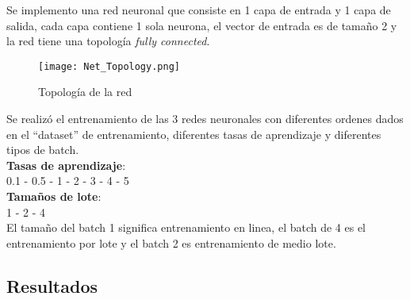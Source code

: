 Se implemento una red neuronal que consiste en 1 capa de entrada y 1 capa de salida, cada capa contiene
1 sola neurona, el vector de entrada es de tamaño 2 y la red tiene una topología \textit{fully connected}.
\begin{figure}[H]
    \centering
    \texttt{[image: Net\_Topology.png]}
    \caption{Topología de la red}
    \label{fig:NetTopology}
\end{figure}
Se realizó el entrenamiento de las 3 redes neuronales con diferentes ordenes dados en el ``dataset'' de
entrenamiento, diferentes tasas de aprendizaje y diferentes tipos de batch.\\[0.5cm]
\textbf{Tasas de aprendizaje}:\\
0.1 - 0.5 - 1 - 2 - 3 - 4 - 5\\[0.5cm]
\textbf{Tamaños de lote}:\\
1 - 2 - 4\\[0.5cm]

El tamaño del batch 1 significa entrenamiento en linea, el batch de 4 es el entrenamiento por lote y el
batch 2 es entrenamiento de medio lote.

\newpage
\subsection{Resultados}
